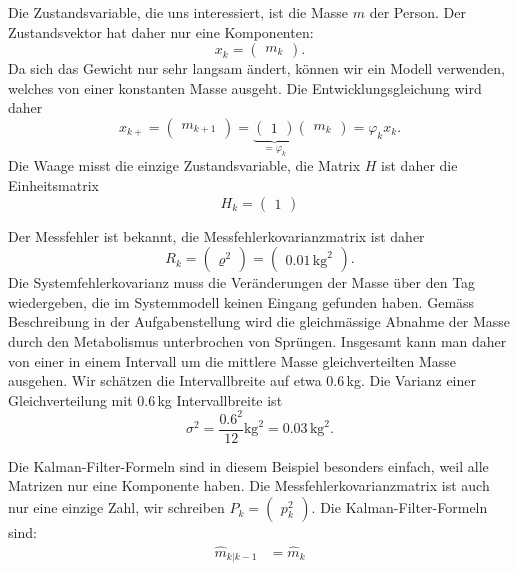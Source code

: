 \begin{loesung}
\begin{teilaufgaben}
\item
Die Zustandsvariable, die uns interessiert, ist die Masse $m$ der Person.
Der Zustandsvektor hat daher nur eine Komponenten:
\[
x_k = \begin{pmatrix}m_k\end{pmatrix}.
\]
Da sich das Gewicht nur sehr langsam ändert, können wir ein Modell verwenden,
welches von einer konstanten Masse ausgeht.
Die Entwicklungsgleichung wird daher
\[
x_{k+}
=
\begin{pmatrix}m_{k+1}\end{pmatrix}
=
\underbrace{\begin{pmatrix}1\end{pmatrix}}_{\displaystyle=\varphi_k}
\begin{pmatrix}m_k\end{pmatrix}
=
\varphi_kx_k.
\]
Die Waage misst die einzige Zustandsvariable, die Matrix $H$ ist
daher die Einheitsmatrix 
\[
H_k = \begin{pmatrix}1\end{pmatrix}
\]
\item
Der Messfehler ist bekannt, die Messfehlerkovarianzmatrix ist daher
\[
R_k
=
\begin{pmatrix} \varrho^2\end{pmatrix}
=
\begin{pmatrix} 0.01\,\text{kg}^2\end{pmatrix}.
\]
Die Systemfehlerkovarianz muss die Veränderungen der Masse über den Tag
wiedergeben, die im Systemmodell keinen Eingang gefunden haben.
Gemäss Beschreibung in der Aufgabenstellung wird die gleichmässige
Abnahme der Masse durch den Metabolismus unterbrochen von Sprüngen.
Insgesamt kann man daher von einer in einem Intervall um die mittlere
Masse gleichverteilten Masse ausgehen.
Wir schätzen die Intervallbreite auf etwa 0.6\,kg.
Die Varianz einer Gleichverteilung mit 0.6\,kg Intervallbreite ist
\[
\sigma^2 = \frac{0.6^2}{12}\text{kg}^2 = 0.03\,\text{kg}^2.
\]
\item
Die Kalman-Filter-Formeln sind in diesem Beispiel besonders einfach,
weil alle Matrizen nur eine Komponente haben.
Die Messfehlerkovarianzmatrix ist auch nur eine einzige Zahl, wir
schreiben $P_k=\begin{pmatrix}p_k^2\end{pmatrix}$.
Die Kalman-Filter-Formeln sind:
\begin{align*}
\hat m_{k|k-1}&=\hat m_k

\end{align*}
\end{teilaufgaben}
\end{loesung}
